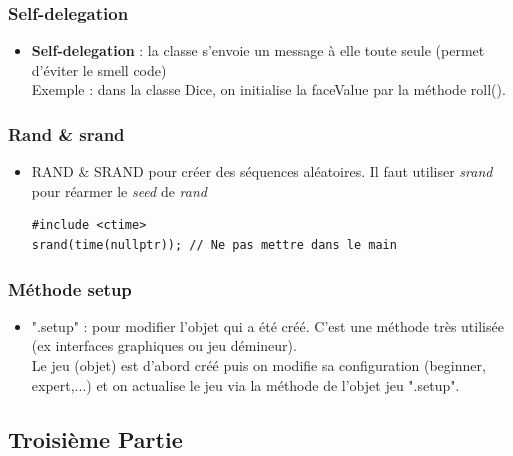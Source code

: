 \documentclass[12pt,a4paper]{article}
\begin{document}
\subsubsection{Self-delegation}
\begin{itemize}
\item \textbf{Self-delegation} : la classe s'envoie un message à elle toute seule (permet d'éviter le smell code)\\
Exemple : dans la classe Dice, on initialise la faceValue par la méthode roll().
\end{itemize}
\subsubsection{Rand \& srand}
\begin{itemize}
\item RAND \& SRAND pour créer des séquences aléatoires. Il faut utiliser \textit{srand} pour réarmer le \textit{seed} de \textit{rand}
\begin{lstlisting}
#include <ctime>
srand(time(nullptr)); // Ne pas mettre dans le main
\end{lstlisting}
\end{itemize}
\subsubsection{Méthode setup}
\begin{itemize}
\item ".setup" : pour modifier l'objet qui a été créé. C'est une méthode très utilisée (ex interfaces graphiques ou jeu démineur).\\
Le jeu (objet) est d'abord créé puis on modifie sa configuration (beginner, expert,...) et on actualise le jeu via la méthode de l'objet jeu ".setup".
\end{itemize}

\subsection{Troisième Partie}
\end{document}
